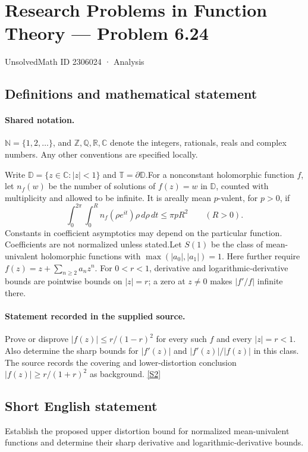 \documentclass[11pt]{article}
\newcommand{\sref}[2]{\hyperlink{source:#1:#2}{[S#2]}}
\begin{document}
\setcounter{section}{2306023}
\section{Research Problems in Function Theory — Problem 6.24}\label{2306024}
{\small\sffamily UnsolvedMath ID 2306024 · Analysis}
\subsection{Definitions and mathematical statement}

\paragraph{Shared notation.}$\mathbb N=\{1,2,\ldots\}$, and $\mathbb Z,\mathbb Q,\mathbb R,\mathbb C$ denote the integers, rationals, reals and complex numbers. Any other conventions are specified locally.


Write $\mathbb D=\{z\in\mathbb C:|z|<1\}$ and $\mathbb T=\partial\mathbb D$.For a nonconstant holomorphic function $f$, let $n_f(w)$ be the number of solutions of $f(z)=w$ in $\mathbb D$, counted with multiplicity and allowed to be infinite. It is areally mean $p$-valent, for $p>0$, if
\[\int_0^{2\pi}\int_0^R n_f(\rho e^{it})\rho\,d\rho\,dt\le\pi pR^2\qquad(R>0).\]
Constants in coefficient asymptotics may depend on the particular function. Coefficients are not normalized unless stated.Let $S(1)$ be the class of mean-univalent holomorphic functions with $\max(|a_0|,|a_1|)=1$. Here further require $f(z)=z+\sum_{n\ge2}a_nz^n$. For $0<r<1$, derivative and logarithmic-derivative bounds are pointwise bounds on $|z|=r$; a zero at $z\ne0$ makes $|f'/f|$ infinite there.
\paragraph{Statement recorded in the supplied source.}
Prove or disprove $|f(z)|\le r/(1-r)^2$ for every such $f$ and every $|z|=r<1$. Also determine the sharp bounds for $|f'(z)|$ and $|f'(z)|/|f(z)|$ in this class. The source records the covering and lower-distortion conclusion $|f(z)|\ge r/(1+r)^2$ as background. \sref{2306024}{2}
\subsection{Short English statement}
Establish the proposed upper distortion bound for normalized mean-univalent functions and determine their sharp derivative and logarithmic-derivative bounds.
\end{document}
